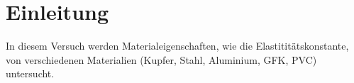 \section{Einleitung}

In diesem Versuch werden Materialeigenschaften, wie die Elastititätskonstante, von verschiedenen Materialien (Kupfer, Stahl, Aluminium, GFK, PVC) untersucht.